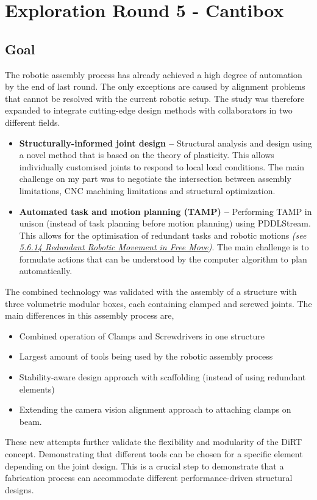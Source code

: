 \chapter{Exploration Round 5 - Cantibox}
\label{chapter:exploration-round-5}

\section{Goal}
\label{section:exploration-5-goal}

The robotic assembly process has already achieved a high degree of automation by the end of last round. The only exceptions are caused by alignment problems that cannot be resolved with the current robotic setup. The study was therefore expanded to integrate cutting-edge design methods with collaborators in two different fields. 

\begin{itemize}
	\item \textbf{Structurally-informed joint design --} Structural analysis and design using a novel method that is based on the theory of plasticity. This allows individually customised joints to respond to local load conditions. The main challenge on my part was to negotiate the intersection between assembly limitations, CNC machining limitations and structural optimization. 

	\item \textbf{Automated task and motion planning (TAMP) --} Performing TAMP in unison (instead of task planning before motion planning) using PDDLStream. This allows for the optimisation of redundant tasks and robotic motions \textit{(see \ul{5.6.14 Redundant Robotic Movement in Free Move})}. The main challenge is to formulate actions that can be understood by the computer algorithm to plan automatically. 

\end{itemize}
The combined technology was validated with the assembly of a structure with three volumetric modular boxes, each containing clamped and screwed joints. The main differences in this assembly process are,

\begin{itemize}
	\item Combined operation of Clamps and Screwdrivers in one structure

	\item Largest amount of tools being used by the robotic assembly process

	\item Stability-aware design approach with scaffolding (instead of using redundant elements)

	\item Extending the camera vision alignment approach to attaching clamps on beam.

\end{itemize}
These new attempts further validate the flexibility and modularity of the DiRT concept. Demonstrating that different tools can be chosen for a specific element depending on the joint design. This is a crucial step to demonstrate that a fabrication process can accommodate different performance-driven structural designs.  

